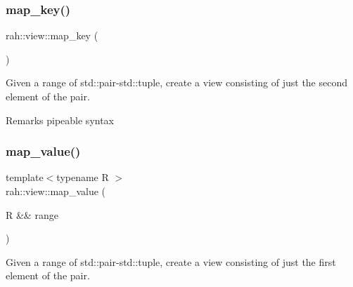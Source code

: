 \subsubsection{\texorpdfstring{map\_key()}{map\_key()}\hspace{0.1cm}{\footnotesize\ttfamily [2/2]}}
{\footnotesize\ttfamily rah\+::view\+::map\+\_\+key (\begin{DoxyParamCaption}{ }\end{DoxyParamCaption})\hspace{0.3cm}{\ttfamily [inline]}}



Given a range of std\+::pair-\/std\+::tuple, create a view consisting of just the second element of the pair. 

\begin{DoxyRemark}{Remarks}
pipeable syntax
\end{DoxyRemark}

\begin{DoxyCodeInclude}{0}
\end{DoxyCodeInclude}
\mbox{\label{namespacerah_1_1view_abde9f999ff37f8b31f7a25598f2b4a25}} 
\subsubsection{\texorpdfstring{map\_value()}{map\_value()}\hspace{0.1cm}{\footnotesize\ttfamily [1/2]}}
{\footnotesize\ttfamily template$<$typename R $>$ \\
rah\+::view\+::map\+\_\+value (\begin{DoxyParamCaption}\item[{R \&\&}]{range }\end{DoxyParamCaption})}



Given a range of std\+::pair-\/std\+::tuple, create a view consisting of just the first element of the pair. 



